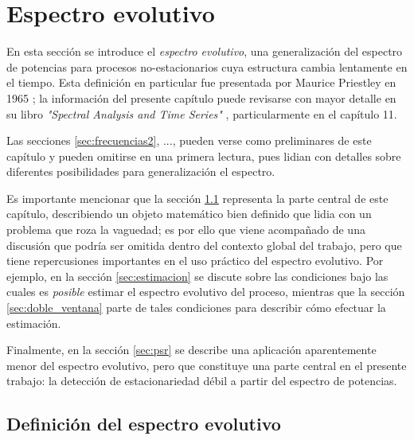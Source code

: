 
\chapter{Espectro evolutivo}

En esta sección se introduce el \textit{espectro evolutivo}, una generalización del espectro de 
potencias para procesos no-estacionarios cuya estructura cambia lentamente en el tiempo.
%
Esta definición en particular fue presentada por Maurice Priestley en 1965 \cite{Priestley65}; la
información del presente capítulo puede revisarse con mayor detalle en su libro \textit{"Spectral
Analysis and Time Series"} \cite{Priestley81}, particularmente en el capítulo 11.

Las secciones \ref{sec:frecuencias2}, ..., pueden verse como preliminares de este capítulo y pueden
omitirse en una primera lectura, pues lidian con detalles sobre diferentes posibilidades para 
generalización el espectro.

Es importante mencionar que la sección \ref{sec:espectro} representa la parte central de este capítulo, describiendo un objeto matemático bien definido que lidia con un problema que roza la vaguedad; es por ello que viene acompañado de una discusión que podría ser omitida dentro del contexto global del trabajo, pero que tiene repercusiones importantes en el uso práctico del espectro evolutivo.
%
Por ejemplo, en la sección \ref{sec:estimacion} se discute sobre las condiciones bajo las cuales es \textit{posible} estimar el espectro evolutivo del proceso, mientras que la sección \ref{sec:doble_ventana} parte de tales condiciones para describir cómo efectuar la estimación.

Finalmente, en la sección \ref{sec:psr} se describe una aplicación aparentemente menor del espectro evolutivo, pero que constituye una parte central en el presente trabajo: la detección de estacionariedad débil a partir del espectro de potencias.


\section{Definición del espectro evolutivo}
\label{sec:espectro}

